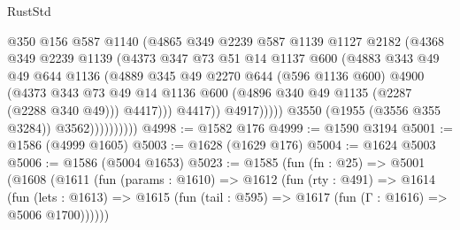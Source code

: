 \begin{lexlean}{RustStd}
\begin{coremodule}
                                @350
                                @156
                                @587
                                @1140
                                (@4865
                                  @349
                                  @2239
                                  @587
                                  @1139
                                  @1127
                                  @2182
                                  (@4368
                                    @349
                                    @2239
                                    @1139
                                    (@4373
                                      @347
                                      @73
                                      @51
                                      @14
                                      @1137
                                      @600
                                      (@4883
                                        @343
                                        @49
                                        @49
                                        @644
                                        @1136
                                        (@4889
                                          @345
                                          @49
                                          @2270
                                          @644
                                          (@596 @1136 @600)
                                          @4900
                                          (@4373
                                            @343
                                            @73
                                            @49
                                            @14
                                            @1136
                                            @600
                                            (@4896 @340 @49 @1135 (@2287 (@2288 @340 @49)))
                                            @4417)))
                                      @4417))
                                  @4917)))))
                        @3550
                        (@1955 (@3556 @355 @3284))
                        @3562))))))))))
@4998 := @1582 @176
@4999 := @1590 @3194
@5001 := @1586 (@4999 @1605)
@5003 := @1628 (@1629 @176)
@5004 := @1624 @5003
@5006 := @1586 (@5004 @1653)
@5023 := @1585
    (fun (fn : @25) =>
    @5001
      (@1608
        (@1611
          (fun (params : @1610) =>
          @1612
            (fun (rty : @491) =>
            @1614
              (fun (lets : @1613) =>
              @1615 (fun (tail : @595) => @1617 (fun (Γ : @1616) => @5006 @1700))))))

\end{coremodule}
\end{lexlean}
